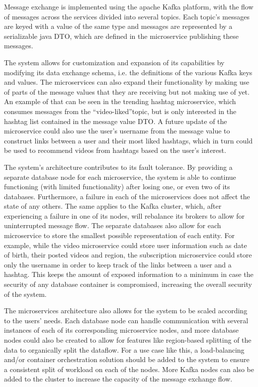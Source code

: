 \documentclass[parskip=full]{article}
\begin{document}
    Message exchange is implemented using the apache Kafka platform, with the flow of messages across the services divided into several topics.
    Each topic's messages are keyed with a value of the same type and messages are represented by a serializable java DTO, which are defined in the microservice publishing these messages.

    The system allows for customization and expansion of its capabilities by modifying its data exchange schema, i.e. the definitions of the various Kafka keys and values.
    The microservices can also expand their functionality by making use of parts of the message values that they are receiving but not making use of yet.
    An example of that can be seen in the trending hashtag microservice, which consumes messages from the ``video-liked''topic, but is only interested in the hashtag list contained in the message value DTO. A future update of the microservice could also use the user's username from the message value to construct links between a user and their most liked hashtags, which in turn could be used to recommend videos from hashtags based on the user's interest.

    The system's architecture contributes to its fault tolerance.
    By providing a separate database node for each microservice, the system is able to continue functioning (with limited functionality) after losing one, or even two of its databases.
    Furthermore, a failure in each of the microservices does not affect the state of any others.
    The same applies to the Kafka cluster, which, after experiencing a failure in one of its nodes, will rebalance its brokers to allow for uninterrupted message flow.
    The separate databases also allow for each microservice to store the smallest possible representation of each entity.
    For example, while the video microservice could store user information such as date of birth, their posted videos and region, the subscription microservice could store only the username in order to keep track of the links between a user and a hashtag.
    This keeps the amount of exposed information to a minimum in case the security of any database container is compromised, increasing the overall security of the system.

    The microservices architecture also allows for the system to be scaled according to the users' needs.
    Each database node can handle communication with several instances of each of its corresponding microservice nodes, and more database nodes could also be created to allow for features like region-based splitting of the data to organically split the dataflow.
    For a use case like this, a load-balancing and/or container orchestration solution should be added to the system to ensure a consistent split of workload on each of the nodes.
    More Kafka nodes can also be added to the cluster to increase the capacity of the message exchange flow.
\end{document}
